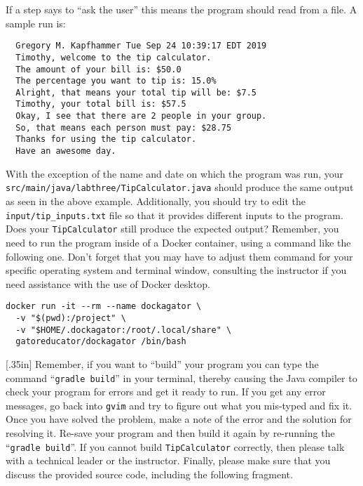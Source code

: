 \documentclass[11pt]{article}
\newcommand{\mainprogram}{\lstinline{TipCalculator}}
\newcommand{\mainprogramsource}{\lstinline{src/main/java/labthree/TipCalculator.java}}
\newcommand{\mainprograminput}{\lstinline{input/tip_inputs.txt}}
\newcommand{\gradlebuild}{\command{gradle build}}
\newcommand{\command}[1]{``\lstinline{#1}''}
\newcommand{\program}[1]{\lstinline{#1}}
\newcommand{\option}[1]{``{#1}''}
\newcommand{\step}[1]{``{#1}''}
\newcommand{\discuss}[1]{\null\hfill\LARGE{\faCommentO{}}\newline\scriptsize{\em{#1}}}
\begin{document}
\noindent If a step says to ``ask the user'' this means the program should read
from a file. A sample run is:

\begin{verbatim}
  Gregory M. Kapfhammer Tue Sep 24 10:39:17 EDT 2019
  Timothy, welcome to the tip calculator.
  The amount of your bill is: $50.0
  The percentage you want to tip is: 15.0%
  Alright, that means your total tip will be: $7.5
  Timothy, your total bill is: $57.5
  Okay, I see that there are 2 people in your group.
  So, that means each person must pay: $28.75
  Thanks for using the tip calculator.
  Have an awesome day.
\end{verbatim}

With the exception of the name and date on which the program was run, your
\mainprogramsource{} should produce the same output as seen in the above
example. Additionally, you should try to edit the \mainprograminput{} file so
that it provides different inputs to the program. Does your \mainprogram{} still
produce the expected output? Remember, you need to run the program inside of a
Docker container, using a command like the following one. Don't forget that you
may have to adjust them command for your specific operating system and terminal
window, consulting the instructor if you need assistance with the use of Docker
desktop.

\begin{verbatim}
docker run -it --rm --name dockagator \
  -v "$(pwd):/project" \
  -v "$HOME/.dockagator:/root/.local/share" \
  gatoreducator/dockagator /bin/bash
\end{verbatim}


\marginnote{\discuss{Discuss input code}}[.35in] Remember, if you want to
\step{build} your program you can type the command \gradlebuild{} in your
terminal, thereby causing the Java compiler to check your program for errors and
get it ready to run. If you get any error messages, go back into \program{gvim}
and try to figure out what you mis-typed and fix it. Once you have solved the
problem, make a note of the error and the solution for resolving it. Re-save
your program and then build it again by re-running the \gradlebuild{}. If you
cannot build \mainprogram{} correctly, then please talk with a technical leader
or the instructor. Finally, please make sure that you discuss the provided
source code, including the following fragment.
\end{document}
